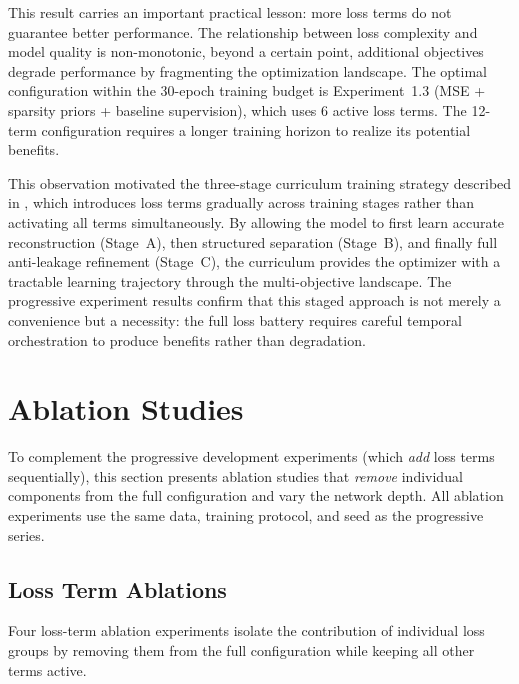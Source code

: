 This result carries an important practical lesson: more loss terms do not guarantee better performance. The relationship between loss complexity and model quality is non-monotonic, beyond a certain point, additional objectives degrade performance by fragmenting the optimization landscape. The optimal configuration within the 30-epoch training budget is Experiment~1.3 (MSE + sparsity priors + baseline supervision), which uses 6 active loss terms. The 12-term configuration requires a longer training horizon to realize its potential benefits.

This observation motivated the three-stage curriculum training strategy described in , which introduces loss terms gradually across training stages rather than activating all terms simultaneously. By allowing the model to first learn accurate reconstruction (Stage~A), then structured separation (Stage~B), and finally full anti-leakage refinement (Stage~C), the curriculum provides the optimizer with a tractable learning trajectory through the multi-objective landscape. The progressive experiment results confirm that this staged approach is not merely a convenience but a necessity: the full loss battery requires careful temporal orchestration to produce benefits rather than degradation.


\section{Ablation Studies}
\label{sec:results_ablation}

To complement the progressive development experiments (which \emph{add} loss terms sequentially), this section presents ablation studies that \emph{remove} individual components from the full configuration and vary the network depth. All ablation experiments use the same data, training protocol, and seed as the progressive series.

\subsection{Loss Term Ablations}
\label{sec:results_loss_ablation}

Four loss-term ablation experiments isolate the contribution of individual loss groups by removing them from the full configuration while keeping all other terms active.

